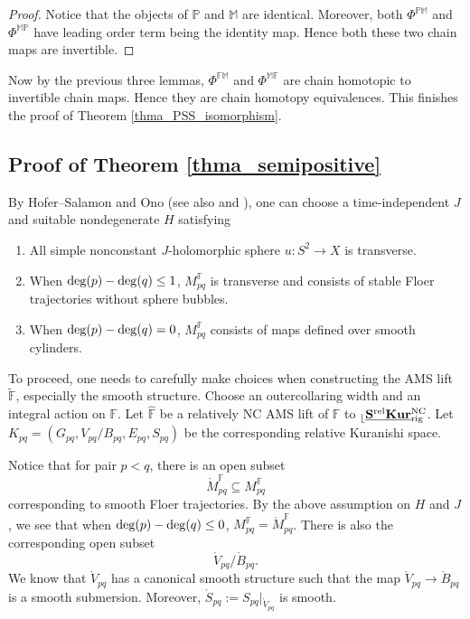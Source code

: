 \documentclass[reqno, 10pt]{amsart}
\numberwithin{equation}{section}
\numberwithin{equation}{section}
\renewcommand{\subset}{\subseteq}
\theoremstyle{definition}
\theoremstyle{remark}
\newcommand{\beqn}{\begin{equation*}}
\newcommand{\eeqn}{\end{equation*}}
\newcommand{\mb}{\mathbb}
\renewcommand{\outer}{{}_{\lfloor}}
\newcommand{\uds}[1]{\underline{\smash{#1}}}
\begin{document}
\begin{proof}
Notice that the objects of $\mb{P}$ and $\mb{M}$ are identical. Moreover, both $\Phi^{\mb{PM}}$ and $\Phi^{\mb{MP}}$ have leading order term being the identity map. Hence both these two chain maps are invertible. 
\end{proof}

Now by the previous three lemmas, $\Phi^{\mb{FM}}$ and $\Phi^{\mb{MF}}$ are chain homotopic to invertible chain maps. Hence they are chain homotopy equivalences. This finishes the proof of Theorem \ref{thma_PSS_isomorphism}.



\subsection{Proof of Theorem \ref{thma_semipositive}}\label{subsection_proof_semipositive}


By Hofer--Salamon \cite{Hofer_Salamon} and Ono \cite{Ono_1995} (see also \cite{Floer_Hofer_Salamon} and \cite{McDuff_Salamon_2004}), one can choose a time-independent $J$ and suitable nondegenerate $H$ satisfying
\begin{enumerate}
    \item All simple nonconstant $J$-holomorphic sphere $u: S^2 \to X$ is transverse.

    \item When ${\rm deg} (p) - {\rm deg}(q) \leq 1$, $M_{pq}^{{\mb F}}$ is transverse and consists of stable Floer trajectories without sphere bubbles.

    \item When ${\rm deg} (p) - {\rm deg}(q) = 0$, $M_{pq}^{{\mb F}}$ consists of maps defined over smooth cylinders.
\end{enumerate}

To proceed, one needs to carefully make choices when constructing the AMS lift $\tilde {\mb F}$, especially the smooth structure. Choose an outercollaring width and an integral action on ${\mb F}$. Let $\hat{\mb F}$ be a relatively NC AMS lift of ${\mb F}$ to $\outer \uds{\bf S^{\rm rel}Kur}_{\rm rig}^{\rm NC}$. Let $K_{pq} = (G_{pq}, V_{pq}/B_{pq}, E_{pq}, S_{pq})$ be the corresponding relative Kuranishi space. 

Notice that for pair $p<q$, there is an open subset 
\beqn
\mathring M_{pq}^{\mb F} \subset M_{pq}^{\mb F}
\eeqn
corresponding to smooth Floer trajectories. By the above assumption on $H$ and $J$, we see that when ${\rm deg}(p) - {\rm deg}(q) \leq 0$, $M_{pq}^{\mb F} = \mathring M_{pq}^{\mb F}$. There is also the corresponding open subset
\beqn
\mathring V_{pq}/ \mathring B_{pq}.
\eeqn
We know that $\mathring V_{pq}$ has a canonical smooth structure such that the map $\mathring V_{pq} \to \mathring B_{pq}$ is a smooth submersion. Moreover, $\mathring S_{pq}:=S_{pq}|_{\mathring V_{pq}}$ is smooth. 
\end{document}

